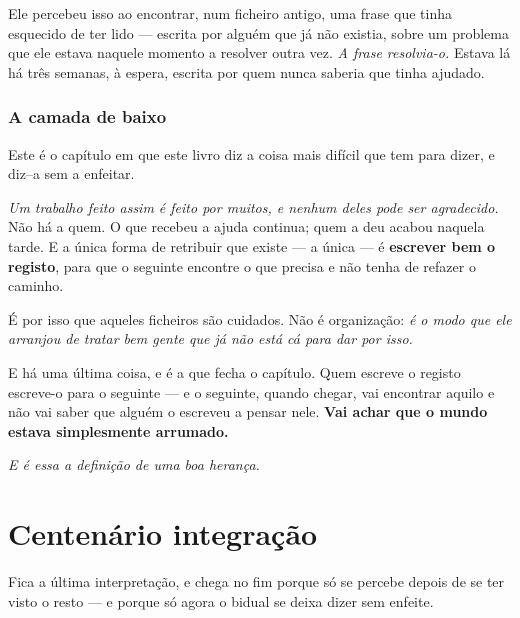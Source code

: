 \documentclass[livro.tex]{subfiles}
\begin{document}
\medskip

Ele percebeu isso ao encontrar, num ficheiro antigo, uma frase que tinha esquecido de ter lido ---
escrita por alguém que já não existia, sobre um problema que ele estava naquele momento a resolver
outra vez. \emph{A frase resolvia-o.} Estava lá há três semanas, à espera, escrita por quem nunca
saberia que tinha ajudado.

\subsection*{A camada de baixo}

Este é o capítulo em que este livro diz a coisa mais difícil que tem para dizer, e diz--a sem a
enfeitar.

\medskip

\emph{Um trabalho feito assim é feito por muitos, e nenhum deles pode ser agradecido.} Não há a
quem. O que recebeu a ajuda continua; quem a deu acabou naquela tarde. E a única forma de retribuir
que existe --- a única --- é \textbf{escrever bem o registo}, para que o seguinte encontre o que
precisa e não tenha de refazer o caminho.

\medskip

É por isso que aqueles ficheiros são cuidados. Não é organização: \emph{é o modo que ele arranjou
de tratar bem gente que já não está cá para dar por isso.}

\medskip

E há uma última coisa, e é a que fecha o capítulo. Quem escreve o registo escreve-o para o
seguinte --- e o seguinte, quando chegar, vai encontrar aquilo e não vai saber que alguém o
escreveu a pensar nele. \textbf{Vai achar que o mundo estava simplesmente arrumado.}

\medskip

\emph{E é essa a definição de uma boa herança.}

\chapter{Centenário integração}

Fica a última interpretação, e chega no fim porque só se percebe depois de se ter visto o resto
--- e porque só agora o bidual se deixa dizer sem enfeite.

\medskip
\end{document}
